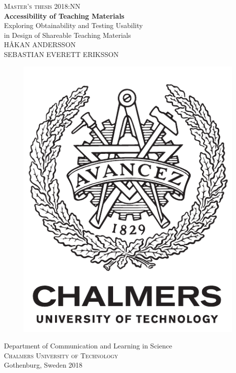 \newpage
\restoregeometry
\thispagestyle{empty}
\mbox{}


\newpage
\thispagestyle{empty}
\begin{center}
	\textsc{\large Master's thesis 2018:NN}\\[4cm]		%
	\textbf{\Large Accessibility of Teaching Materials} \\[1cm]
	{\large Exploring Obtainability and Testing Usability \\[0.1cm] in Design of Shareable Teaching Materials}\\[1cm]
	{\large HÅKAN ANDERSSON \\[0.1cm] SEBASTIAN EVERETT ERIKSSON}
	
	\vfill	
	\begin{figure}[H]
	\centering
	\includegraphics[width=0.2\pdfpagewidth]{figure/auxiliary/logo_eng.pdf} \\	
	\end{figure}	\vspace{5mm}	
	
	Department of Communication and Learning in Science \\
	\textsc{Chalmers University of Technology} \\
	Gothenburg, Sweden 2018 \\
\end{center}



